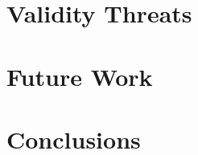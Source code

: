 \documentclass{report}
\begin{document}
\section{Validity Threats}
\section{ Future Work}
\section{Conclusions}
\end{document}
